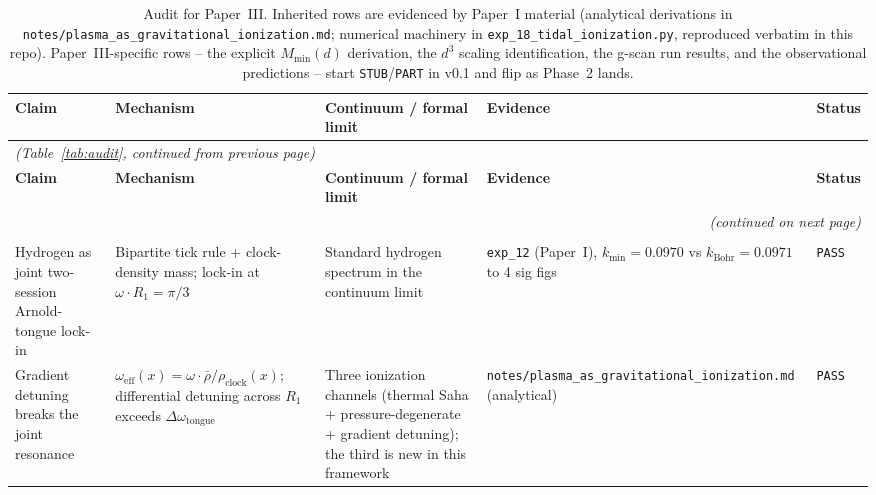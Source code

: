 {\scriptsize
\setlength{\tabcolsep}{4pt}
\renewcommand{\arraystretch}{0.95}
\begin{longtable}{@{}p{2.8cm}p{3.6cm}p{3.6cm}p{4.0cm}p{1.0cm}@{}}
\caption{\small Audit for Paper~III.  Inherited rows are evidenced by
Paper~I material (analytical derivations in
\texttt{notes/plasma\_as\_gravitational\_ionization.md}; numerical
machinery in \texttt{exp\_18\_tidal\_ionization.py}, reproduced
verbatim in this repo).  Paper~III-specific rows -- the explicit
$M_\text{min}(d)$ derivation, the $d^3$ scaling identification, the
g-scan run results, and the observational predictions -- start
\texttt{STUB}/\texttt{PART} in v0.1 and flip as Phase~2 lands.}
\label{tab:audit_caption} \\
\hline
\textbf{Claim} & \textbf{Mechanism} & \textbf{Continuum / formal limit} & \textbf{Evidence} & \textbf{Status} \\
\hline
\endfirsthead

\multicolumn{5}{l}{\textit{(Table~\ref{tab:audit}, continued from previous page)}} \\
\hline
\textbf{Claim} & \textbf{Mechanism} & \textbf{Continuum / formal limit} & \textbf{Evidence} & \textbf{Status} \\
\hline
\endhead

\hline
\multicolumn{5}{r}{\textit{(continued on next page)}} \\
\endfoot

\hline
\endlastfoot

\multicolumn{5}{l}{\textit{Inherited from Paper~I~\cite{menendez2026geometry}.}} \\
\hline

Hydrogen as joint two-session Arnold-tongue lock-in
    & Bipartite tick rule + clock-density mass; lock-in at
      $\omega \cdot R_1 = \pi/3$
    & Standard hydrogen spectrum in the continuum limit
    & \texttt{exp\_12} (Paper~I), $k_\text{min} = 0.0970$ vs
      $k_\text{Bohr} = 0.0971$ to 4 sig figs
    & \texttt{PASS} \\

Gradient detuning breaks the joint resonance
    & $\omega_\text{eff}(x) = \omega \cdot \bar{\rho} /
      \rho_\text{clock}(x)$; differential detuning across $R_1$
      exceeds $\Delta\omega_\text{tongue}$
    & Three ionization channels (thermal Saha + pressure-degenerate
      + gradient detuning); the third is new in this framework
    & \texttt{notes/plasma\_as\_gravitational\_ionization.md}
      (analytical)
    & \texttt{PASS} \\


\end{longtable}}
